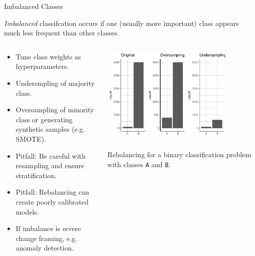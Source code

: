 	\begin{frame}{Imbalanced Classes}
	
		\textit{Imbalanced} classifcation occurs if one (usually more important) class appears much less frequent than other classes.

		\begin{columns}
			\begin{column}{0.6\textwidth}
				\begin{itemize}
					\item Tune class weights as hyperparameters.
					\item Undersmpling of majority class.
					\item Oversampling of minority class or generating synthetic samples (e.g. SMOTE).
					\item Pitfall: Be careful with resampling and ensure stratification.
					\item Pitfall: Rebalancing can create poorly calibrated models.
					\item If imbalance is severe change framing, e.g. anomaly detection.
				\end{itemize}
			\end{column}%
			\begin{column}{0.4\textwidth}
				\begin{center}
					\includegraphics[width=0.8\textwidth]{images/imbalanced_resampling.pdf}
				\end{center}
			\scriptsize{Rebalancing for a binary classification problem with classes \texttt{A} and \texttt{B}.}
			\end{column}
		\end{columns}
	\end{frame}
	
	
	

